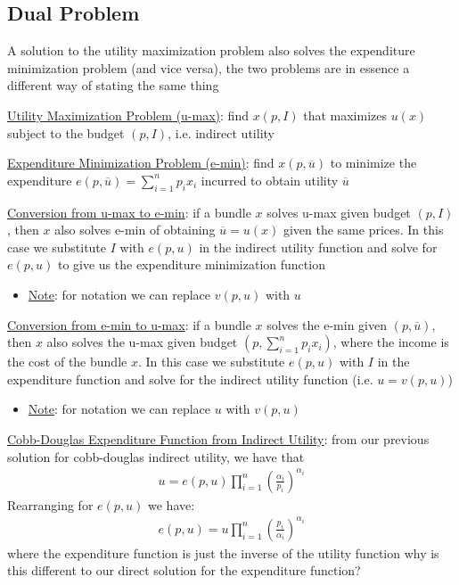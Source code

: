 \documentclass{article}
\begin{document}
\subsection{Dual Problem}
A solution to the utility maximization problem also solves the expenditure minimization problem (and vice versa), the two problems are in essence a different way of stating the same thing \par \vspace{0.3em}
  \underline{Utility Maximization Problem (u-max)}: find $x(p, I)$ that maximizes $u(x)$ subject to the budget $(p, I)$, i.e. indirect utility
  \par
  \underline{Expenditure Minimization Problem (e-min)}: find $x(p, \overline{u})$ to minimize the expenditure $e(p,\overline{u}) = \sum_{i=1}^{n}p_{i}x_{i}$ incurred to obtain utility $\overline{u}$
  \par
  \underline{Conversion from u-max to e-min}: if a bundle $x$ solves u-max given budget $(p, I)$, then $x$ also solves e-min of obtaining $\overline{u} = u(x)$ given the same prices. In this case we substitute $I$ with $e(p,u)$ in the indirect utility function and solve for $e(p,u)$ to give us the expenditure minimization function
  \begin{itemize}
    \item  \underline{Note}: for notation we can replace $v(p,u)$ with $u$
  \end{itemize}
  \par
  \underline{Conversion from e-min to u-max}: if a bundle $x$ solves the e-min given $(p, \overline{u})$, then $x$ also solves the u-max given budget $(p, \sum_{i=1}^{n}p_{i}x_{i})$, where the income is the cost of the bundle $x$. In this case we substitute $e(p,u)$ with $I$ in the expenditure function and solve for the indirect utility function (i.e. $u = v(p,u)$)
  \begin{itemize}
    \item  \underline{Note}: for notation we can replace $u$ with $v(p,u)$
  \end{itemize}
  \par
  \underline{Cobb-Douglas Expenditure Function from Indirect Utility}: from our previous solution for cobb-douglas indirect utility, we have that
  \begin{gather*}
    u = e(p,u) \prod_{i=1}^{n} (\frac{\alpha_{i}}{p_{i}})^{\alpha_{i}}
  \end{gather*}
  Rearranging for $e(p,u)$ we have:
  \begin{gather*}
    e(p,u) = u \prod_{i=1}^{n} (\frac{p_{i}}{\alpha_{i}})^{\alpha_{i}}
  \end{gather*}
  where the expenditure function is just the inverse of the utility function \begingroup\color{magenta} why is this different to our direct solution for the expenditure function? \endgroup
  \par
\vspace{6mm}
\end{document}
